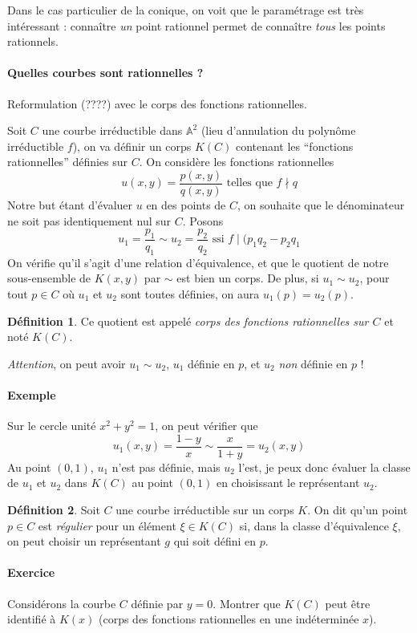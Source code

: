 \documentclass[a4paper, 11pt]{article}
\theoremstyle{definition}
\newtheorem{définition}{Définition}
\newcommand{\aff}{\mathbb{A}}
\begin{document}
Dans le cas particulier de la conique, on voit que le paramétrage est
très intéressant : connaître \emph{un} point rationnel permet de
connaître \emph{tous} les points rationnels.

\paragraph{Quelles courbes sont rationnelles ?} Reformulation (????)
avec le corps des fonctions rationnelles.

Soit $C$ une courbe irréductible dans $\aff^2$ (lieu d'annulation du
polynôme irréductible $f$), on va définir un corps $K(C)$ contenant
les \enquote{fonctions rationnelles} définies sur $C$. On considère
les fonctions rationnelles
\[ u(x,y) = \frac{p(x,y)}{q(x,y)} \text{ telles que } f \nmid q \]
Notre but étant d'évaluer $u$ en des points de $C$, on souhaite que le
dénominateur ne soit pas identiquement nul sur $C$. Posons
\[ u_1 = \frac{p_1}{q_1} \sim u_2 = \frac{p_2}{q_2} \text{ ssi } f
\mid (p_1q_2 - p_2q_1 \]
On vérifie qu'il s'agit d'une relation d'équivalence, et que le
quotient de notre sous-ensemble de $K(x,y)$ par $\sim$ est bien un
corps. De plus, si $u_1 \sim u_2$, pour tout $p \in C$ où $u_1$ et
$u_2$ sont toutes définies, on aura $u_1(p) = u_2(p)$.
\begin{définition}
  Ce quotient est appelé \emph{corps des fonctions rationnelles sur
    $C$} et noté $K(C)$.
\end{définition}
\emph{Attention}, on peut avoir $u_1 \sim u_2$, $u_1$ définie en $p$,
et $u_2$ \emph{non} définie en $p$ !

\paragraph{Exemple} Sur le cercle unité $x^2 + y^2 = 1$, on peut
vérifier que
\[ u_1(x,y) = \frac{1-y}{x} \sim \frac{x}{1+y} = u_2(x,y) \]
Au point $(0,1)$, $u_1$ n'est pas définie, mais $u_2$ l'est, je peux
donc évaluer la classe de $u_1$ et $u_2$ dans $K(C)$ au point $(0,1)$
en choisissant le représentant $u_2$.

\begin{définition}
  Soit $C$ une courbe irréductible sur un corps $K$. On dit qu'un point
  $p \in C$ est \emph{régulier} pour un élément $\xi \in K(C)$ si,
  dans la classe d'équivalence $\xi$, on peut choisir un représentant
  $g$ qui soit défini en $p$.
\end{définition}

\paragraph{Exercice}
Considérons la courbe $C$ définie par $y = 0$.
Montrer que $K(C)$ peut être identifié à $K(x)$ (corps des fonctions
rationnelles en une indéterminée $x$).
\end{document}
